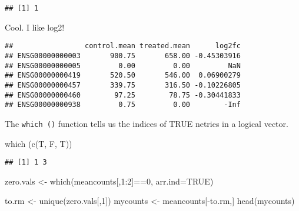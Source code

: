 \documentclass[
]{article}
\newenvironment{Shaded}{\begin{snugshade}}{\end{snugshade}}
\newcommand{\AttributeTok}[1]{\textcolor[rgb]{0.77,0.63,0.00}{#1}}
\newcommand{\ConstantTok}[1]{\textcolor[rgb]{0.00,0.00,0.00}{#1}}
\newcommand{\DecValTok}[1]{\textcolor[rgb]{0.00,0.00,0.81}{#1}}
\newcommand{\FunctionTok}[1]{\textcolor[rgb]{0.00,0.00,0.00}{#1}}
\newcommand{\NormalTok}[1]{#1}
\newcommand{\OtherTok}[1]{\textcolor[rgb]{0.56,0.35,0.01}{#1}}
\newcommand{\SpecialCharTok}[1]{\textcolor[rgb]{0.00,0.00,0.00}{#1}}
\newcommand{\StringTok}[1]{\textcolor[rgb]{0.31,0.60,0.02}{#1}}
\begin{document}
\begin{verbatim}
## [1] 1
\end{verbatim}

Cool. I like log2!

\begin{Shaded}
\end{Shaded}

\begin{verbatim}
##                 control.mean treated.mean      log2fc
## ENSG00000000003       900.75       658.00 -0.45303916
## ENSG00000000005         0.00         0.00         NaN
## ENSG00000000419       520.50       546.00  0.06900279
## ENSG00000000457       339.75       316.50 -0.10226805
## ENSG00000000460        97.25        78.75 -0.30441833
## ENSG00000000938         0.75         0.00        -Inf
\end{verbatim}

The \texttt{which\ ()} function tells us the indices of TRUE netries in
a logical vector.

\begin{Shaded}
\begin{Highlighting}[]
\FunctionTok{which}\NormalTok{ (}\FunctionTok{c}\NormalTok{(T, F, T))}
\end{Highlighting}
\end{Shaded}

\begin{verbatim}
## [1] 1 3
\end{verbatim}

\begin{Shaded}
\begin{Highlighting}[]
\NormalTok{zero.vals }\OtherTok{\textless{}{-}} \FunctionTok{which}\NormalTok{(meancounts[,}\DecValTok{1}\SpecialCharTok{:}\DecValTok{2}\NormalTok{]}\SpecialCharTok{==}\DecValTok{0}\NormalTok{, }\AttributeTok{arr.ind=}\ConstantTok{TRUE}\NormalTok{)}

\NormalTok{to.rm }\OtherTok{\textless{}{-}} \FunctionTok{unique}\NormalTok{(zero.vals[,}\DecValTok{1}\NormalTok{])}
\NormalTok{mycounts }\OtherTok{\textless{}{-}}\NormalTok{ meancounts[}\SpecialCharTok{{-}}\NormalTok{to.rm,]}
\FunctionTok{head}\NormalTok{(mycounts)}
\end{Highlighting}
\end{Shaded}
\end{document}
